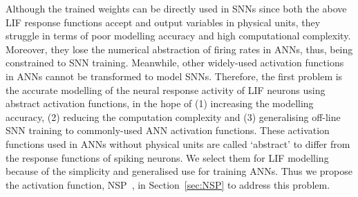	
	Although the trained weights can be directly used in SNNs since both the above LIF response functions accept and output variables in physical units, they struggle in terms of poor modelling accuracy and high computational complexity.
	Moreover, they lose the numerical abstraction of firing rates in ANNs, thus, being constrained to SNN training.
	Meanwhile, other widely-used activation functions in ANNs cannot be transformed to model SNNs.
	Therefore, the first problem is the accurate modelling of the neural response activity of LIF neurons	using abstract activation functions, in the hope of (1) increasing the modelling accuracy, (2) reducing the computation complexity and (3) generalising off-line SNN training to commonly-used ANN activation functions.
	These activation functions used in ANNs without physical units are called `abstract' to differ from the response functions of spiking neurons.
	We select them for LIF modelling because of the simplicity and generalised use for training ANNs.
	Thus we propose the activation function, NSP~\citep{liu2016noisy}, in Section~\ref{sec:NSP} to address this problem.

	
	
